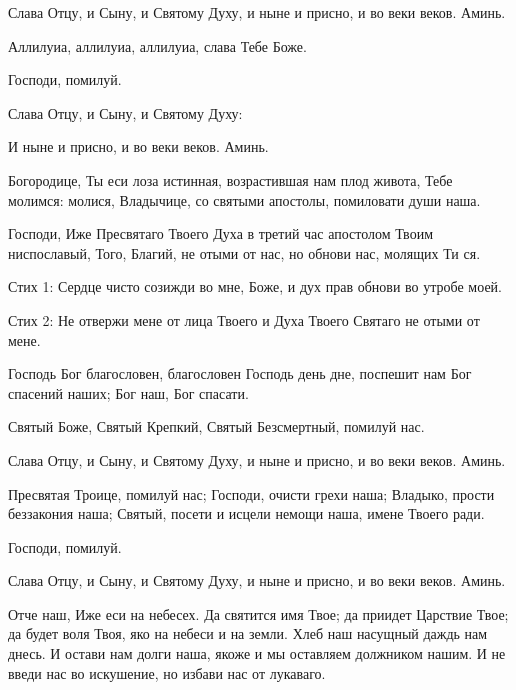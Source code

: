 \begin{mymulticols}

\PsalmFifty





Слава Отцу, и Сыну, и Святому Духу, и ныне и присно, и во веки веков. Аминь.

Аллилуиа, аллилуиа, аллилуиа, слава Тебе Боже.

Господи, помилуй.

Слава Отцу, и Сыну, и Святому Духу:




И ныне и присно, и во веки веков. Аминь.

Богородице, Ты еси лоза истинная, возрастившая нам плод живота, Тебе молимся: молися, Владычице, со святыми апостолы, помиловати души наша.

\myemph{ [Если Великий пост "--- настоящий тропарь, глас 6:}

Господи, Иже Пресвятаго Твоего Духа в третий час апостолом Твоим ниспославый, Того, Благий, не отыми от нас, но обнови нас, молящих Ти ся.

Стих 1: Сердце чисто созижди во мне, Боже, и дух прав обнови во утробе моей. 

Стих 2: Не отвержи мене от лица Твоего и Духа Твоего Святаго не отыми от мене. 

\slavainynen

\myemph{]}

Господь Бог благословен, благословен Господь день дне, поспешит нам Бог спасений наших; Бог наш, Бог спасати.

Святый Боже, Святый Крепкий, Святый Безсмертный, помилуй нас.

Слава Отцу, и Сыну, и Святому Духу, и ныне и присно, и во веки веков. Аминь.

Пресвятая Троице, помилуй нас; Господи, очисти грехи наша; Владыко, прости беззакония наша; Святый, посети и исцели немощи наша, имене Твоего ради.

Господи, помилуй.

Слава Отцу, и Сыну, и Святому Духу, и ныне и присно, и во веки веков. Аминь.

Отче наш, Иже еси на небесех. Да святится имя Твое; да приидет Царствие Твое; да будет воля Твоя, яко на небеси и на земли. Хлеб наш насущный даждь нам днесь. И остави нам долги наша, якоже и мы оставляем должником нашим. И не введи нас во искушение, но избави нас от лукаваго.


\end{mymulticols}
